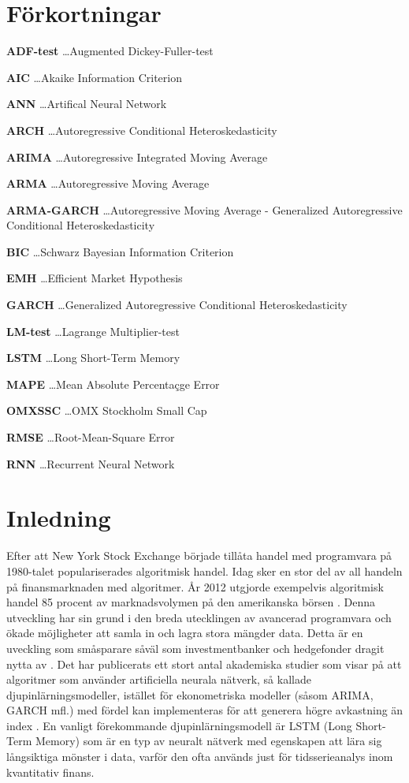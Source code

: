 \documentclass[11pt]{article}
\numberwithin{equation}{section}
\numberwithin{table}{section}
\numberwithin{figure}{section}
\begin{document}
\section*{Förkortningar}
\textbf{ADF-test} \dots Augmented Dickey-Fuller-test \par
\textbf{AIC} \dots Akaike Information Criterion \par
\textbf{ANN} \dots Artifical Neural Network \par
\textbf{ARCH} \dots Autoregressive Conditional Heteroskedasticity \par
\textbf{ARIMA} \dots Autoregressive Integrated Moving Average \par
\textbf{ARMA} \dots Autoregressive Moving Average \par 
\textbf{ARMA-GARCH} \dots Autoregressive Moving Average - Generalized Autoregressive Conditional Heteroskedasticity \par 
\textbf{BIC} \dots Schwarz Bayesian Information Criterion \par
\textbf{EMH} \dots Efficient Market Hypothesis \par
\textbf{GARCH} \dots Generalized Autoregressive Conditional Heteroskedasticity \par
\textbf{LM-test} \dots Lagrange Multiplier-test \par
\textbf{LSTM} \dots Long Short-Term Memory \par
\textbf{MAPE} \dots Mean Absolute Percentaçge Error \par
\textbf{OMXSSC} \dots OMX Stockholm Small Cap \par
\textbf{RMSE} \dots Root-Mean-Square Error \par
\textbf{RNN} \dots Recurrent Neural Network \par

\newpage
\clearpage
\setcounter{page}{1}


\section{Inledning}
Efter att New York Stock Exchange började tillåta handel med programvara på 1980-talet populariserades algoritmisk handel.  Idag sker en stor del av all handeln på finansmarknaden med algoritmer. År 2012 utgjorde exempelvis algoritmisk handel 85 procent av marknadsvolymen på den amerikanska börsen \parencite[][,s.258]{glantz2013multi}. Denna utveckling har sin grund i den breda utecklingen av avancerad programvara och ökade möjligheter att samla in och lagra stora mängder data. Detta är en uveckling som småsparare såväl som investmentbanker och hedgefonder dragit nytta av \parencite{DE_Shaw}. Det har publicerats ett stort antal akademiska studier som visar på att algoritmer som använder artificiella neurala nätverk, så kallade djupinlärningsmodeller, istället för ekonometriska modeller (såsom ARIMA, GARCH mfl.) med fördel kan implementeras för att generera högre avkastning än index \parencite{paliwal2009neural}. En vanligt förekommande djupinlärningsmodell är LSTM (Long Short-Term Memory) som är en typ av neuralt nätverk med egenskapen att lära sig långsiktiga mönster i data, varför den ofta används just för tidsserieanalys inom kvantitativ finans.
\end{document}
